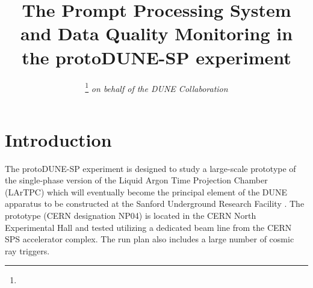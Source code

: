 \documentclass{webofc}
\newcommand{\pd}{protoDUNE\xspace}
\begin{document}
%
\title{The Prompt Processing System and Data Quality Monitoring in the \pd-SP experiment}
%
\author{ 
\fnsep\thanks{} \it{on behalf of the DUNE Collaboration}
}




%
\maketitle
%
\section{Introduction}
\label{sec:intro}
The \pd-SP experiment is designed to study a large-scale prototype of the single-phase version of
the Liquid Argon Time Projection Chamber (LArTPC) which will eventually become
the principal element of the DUNE apparatus to be constructed at the Sanford Underground
Research Facility \cite{cdrVol1, cdrVol4}. The prototype (CERN designation NP04) is located
in the CERN North Experimental Hall and tested utilizing a dedicated beam line from the CERN SPS
accelerator complex. The run plan also includes a large number of cosmic ray triggers.
\end{document}
